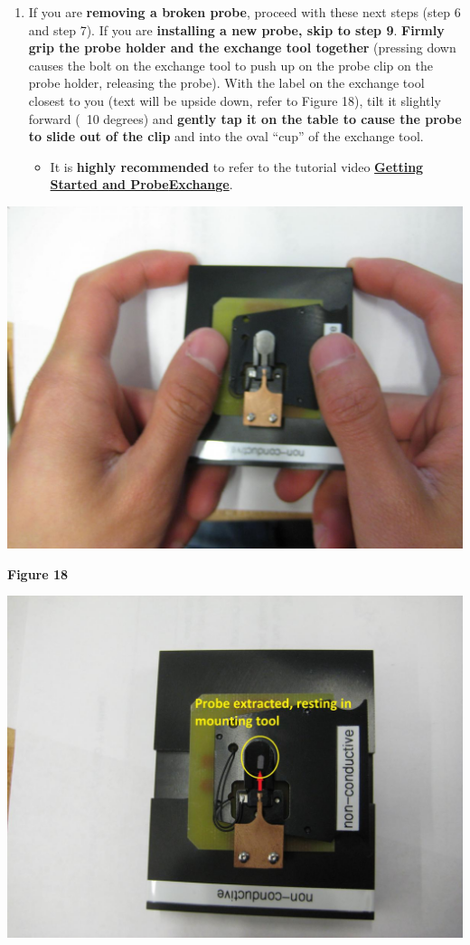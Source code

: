 \documentclass{../lab}
\begin{document}
\begin{enumerate}
    \item If you are \textbf{removing a broken probe}, proceed with these next steps (step 6 and step 7).  If you are\textbf{ installing a new probe, skip to step 9}. \textbf{Firmly grip the probe holder and the exchange tool together} (pressing down causes the bolt on the exchange tool to push up on the probe clip on the probe holder, releasing the probe).  With the label on the exchange tool closest to you (text will be upside down, refer to Figure 18), tilt it slightly forward (~10 degrees) and \textbf{gently tap it on the table to cause the probe to slide out of the clip} and into the oval ``cup'' of the exchange tool.
    \begin{itemize}
        \item It is \textbf{highly recommended} to refer to the tutorial video \href{http://experimentationlab.berkeley.edu/sites/default/files/gettingstarted\_final2.mp4}{\textbf{Getting Started and Probe}}\href{http://experimentationlab.berkeley.edu/sites/default/files/gettingstarted\_final2.mp4}{\textbf{Exchange}}.

    \end{itemize}

\end{enumerate}


\begin{center}
    \href{http://experimentationlab.berkeley.edu/sites/default/files/AFMImages/18.JPG}{\includegraphics[width=0.5\linewidth]{images/18.JPG}}
\end{center}

\textbf{Figure 18}


\begin{center}
    \href{http://experimentationlab.berkeley.edu/sites/default/files/AFMImages/19.JPG}{\includegraphics[width=0.5\linewidth]{images/19.JPG}}
\end{center}
\end{document}
